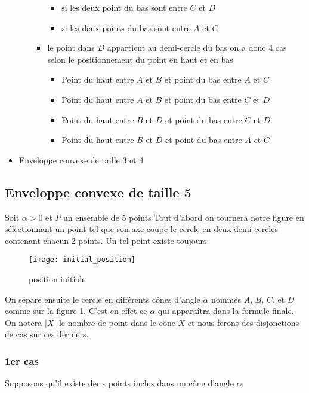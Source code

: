 \begin{itemize}
\begin{itemize}
\begin{itemize}
\begin{itemize}
				\item si les deux point du bas sont entre $C$ et $D$
				\item si les deux points du bas sont entre $A$ et $C$
			\end{itemize}
			\item le point dans $D$ appartient au demi-cercle du bas
			on a donc 4 cas selon le positionnement du point en haut et en bas
			\begin{itemize}
				\item Point du haut entre $A$ et $B$ et point du bas entre $A$ et $C$
				\item Point du haut entre $A$ et $B$ et point du bas entre $C$ et $D$
				\item Point du haut entre $B$ et $D$ et point du bas entre $C$ et $D$
				\item Point du haut entre $B$ et $D$ et point du bas entre $A$ et $C$
			\end{itemize}
		\end{itemize}
	\end{itemize}
	\item Enveloppe convexe de taille 3 et 4
\end{itemize}

\subsection{Enveloppe convexe de taille 5}

Soit $\alpha > 0$ et $P$ un ensemble de 5 points Tout d'abord on tournera notre figure en sélectionnant un point tel que son axe coupe le cercle en deux demi-cercles contenant chacun 2 points. Un tel point existe toujours.

\begin{figure}[h!]
  \centering
  \texttt{[image: initial\_position]}
  \caption{position initiale}
  \label{fig:initial_position}
\end{figure}

On sépare ensuite le cercle en différents cônes d'angle $\alpha$ nommés $A$,
$B$, $C$, et $D$ comme sur la figure \ref{fig:initial_position}. C'est en effet ce $\alpha$ qui apparaîtra dans la formule finale. On notera $|X|$ le nombre de point dans le cône $X$ et nous ferons des disjonctions de cas sur ces derniers.

\subsubsection*{1er cas} Supposons qu'il existe deux points inclus dans un cône d'angle $\alpha$

